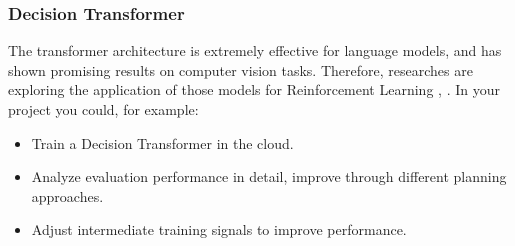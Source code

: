 \documentclass[a4paper]{article}
\begin{document}




\subsubsection{Decision Transformer}
The transformer architecture is extremely effective for language models, and has shown promising results on computer vision tasks.
Therefore, researches are exploring the application of those models for Reinforcement Learning \citet{DecisionTransformer2021}, \citet{Kuang-Huei2022}. In your project you could, for example:
\begin{itemize}
  \item Train a Decision Transformer in the cloud.
  \item Analyze evaluation performance in detail, improve through different planning approaches.
  \item Adjust intermediate training signals to improve performance.
\end{itemize}
\end{document}
